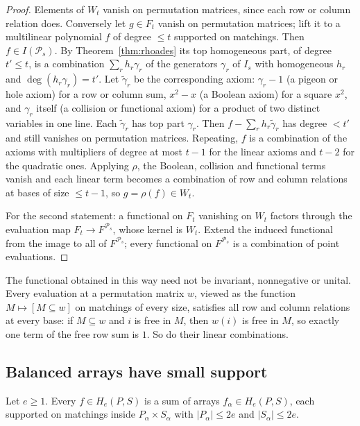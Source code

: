 \begin{proof}
Elements of $W_t$ vanish on permutation matrices, since each row or column relation does.
Conversely let $g\in F_t$ vanish on permutation matrices; lift it to a multilinear
polynomial $f$ of degree $\le t$ supported on matchings.  Then $f\in I(\mathcal P_s)$.  By
Theorem~\ref{thm:rhoades} its top homogeneous part, of degree $t'\le t$, is a combination
$\sum_r h_r\gamma_r$ of the generators $\gamma_r$ of $I_s$ with homogeneous $h_r$ and
$\deg(h_r\gamma_r)=t'$.  Let $\tilde\gamma_r$ be the corresponding axiom: $\gamma_r-1$
(a pigeon or hole axiom) for a row or column sum, $x^2-x$ (a Boolean axiom) for a square
$x^2$, and $\gamma_r$ itself (a collision or functional axiom) for a product of two distinct
variables in one line.  Each $\tilde\gamma_r$ has top part $\gamma_r$.  Then $f-\sum_rh_r\tilde\gamma_r$ has degree $<t'$ and still
vanishes on permutation matrices.  Repeating, $f$ is a combination of the axioms with
multipliers of degree at most $t-1$ for the linear axioms and $t-2$ for the quadratic ones.
Applying $\rho$, the Boolean, collision and functional terms vanish and each linear term becomes a combination of
row and column relations at bases of size $\le t-1$, so $g=\rho(f)\in W_t$.

For the second statement: a functional on $F_t$ vanishing on $W_t$ factors through the
evaluation map $F_t\to F^{\mathcal P_s}$, whose kernel is $W_t$.  Extend the induced
functional from the image to all of $F^{\mathcal P_s}$; every functional on
$F^{\mathcal P_s}$ is a combination of point evaluations.
\end{proof}

The functional obtained in this way need not be invariant, nonnegative or unital.  Every
evaluation at a permutation matrix $w$, viewed as the function $M\mapsto[M\subseteq w]$ on
matchings of every size, satisfies all row and column relations at every base: if
$M\subseteq w$ and $i$ is free in $M$, then $w(i)$ is free in $M$, so exactly one term of
the free row sum is $1$.  So do their linear combinations.

\subsection{Balanced arrays have small support}\label{sec:growth-support}

\begin{lemma}\label{lem:small-support}
Let $e\ge1$.  Every $f\in H_e(P,S)$ is a sum of arrays $f_\alpha\in H_e(P,S)$, each
supported on matchings inside $P_\alpha\times S_\alpha$ with $|P_\alpha|\le2e$ and
$|S_\alpha|\le2e$.
\end{lemma}


